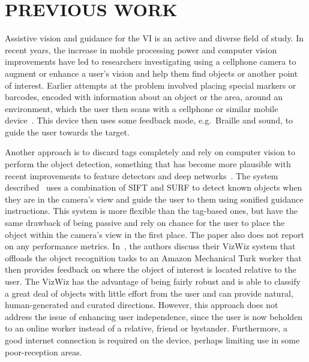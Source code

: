 \documentclass[a4paper, twoside]{article}
\begin{document}
\section{\uppercase{Previous Work}}\label{sec:previous-work}

\noindent Assistive vision and guidance for the VI is an active and diverse field of study. In recent years, the increase in mobile processing power and computer vision improvements have led to researchers investigating using a cellphone camera to augment or enhance a user's vision and help them find objects or another point of interest. Earlier attempts at the problem involved placing special markers or barcodes, encoded with information about an object or the area, around an environment, which the user then scans with a cellphone or similar mobile device~\cite{gude2013blind,iannizzotto2005badge3d,manduchi2012mobile}. This device then uses some feedback mode, e.g.\ Braille and sound, to guide the user towards the target. %

Another approach is to discard tags completely and rely on computer vision to perform the object detection, something that has become more plausible with recent improvements to feature detectors and deep networks~\cite{huang2017speed,redmon2016you}. The system described~\cite{schauerte2012assistive} uses a combination of SIFT and SURF to detect known objects when they are in the camera's view and guide the user to them using sonified guidance instructions. This system is more flexible than the tag-based ones, but have the same drawback of being passive and rely on chance for the user to place the object within the camera's view in the first place. The paper also does not report on any performance metrics. In~\cite{bigham2010vizwiz}, the authors discuss their VizWiz system that offloads the object recognition tasks to an Amazon Mechanical Turk worker that then provides feedback on where the object of interest is located relative to the user. The VizWiz has the advantage of being fairly robust and is able to classify a great deal of objects with little effort from the user and can provide natural, human-generated and curated directions. However, this approach does not address the issue of enhancing user independence, since the user is now beholden to an online worker instead of a relative, friend or bystander. Furthermore, a good internet connection is required on the device, perhaps limiting use in some poor-reception areas.
\end{document}
